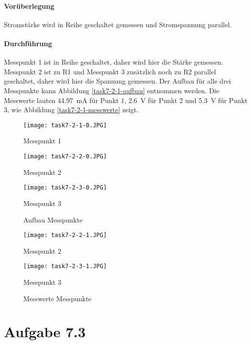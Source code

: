 \paragraph{Vorüberlegung}
Stromstärke wird in Reihe geschaltet gemessen und Stromspannung parallel.

\paragraph{Durchführung}
Messpunkt 1 ist in Reihe geschaltet, daher wird hier die Stärke gemessen. Messpunkt 2 ist zu R1 und Messpunkt 3 zusätzlich noch zu R2 parallel geschaltet, daher wird hier die Spannung gemessen. Der Aufbau für alle drei Messpunkte kann Abbildung \vref{task7-2-1-aufbau} entnommen werden. Die Messwerte lauten \SI{44.97}{\milli\ampere} für Punkt 1, \SI{2,6}{\volt} für Punkt 2 und \SI{5,3}{\volt} für Punkt 3, wie Abbildung \vref{task7-2-1-messwerte} zeigt.

\begin{figure}
	\begin{minipage}[c]{0.32\linewidth}
		\texttt{[image: task7-2-1-0.JPG]}
		\caption{Messpunkt 1}
		\label{task7-2-1-0}
	\end{minipage}
	\hfill
	\begin{minipage}[c]{0.32\linewidth}
		\texttt{[image: task7-2-2-0.JPG]}
		\caption{Messpunkt 2}
		\label{task7-2-2-0}
	\end{minipage}
	\hfill
	\begin{minipage}[c]{0.32\linewidth}
		\texttt{[image: task7-2-3-0.JPG]}
		\caption{Messpunkt 3}
		\label{task7-2-3-0}
	\end{minipage}
	\caption{Aufbau Messpunkte}
	\label{task7-2-1-aufbau}
\end{figure}

\begin{figure}
	\begin{minipage}[c]{0.48\linewidth}
		\texttt{[image: task7-2-2-1.JPG]}
		\caption{Messpunkt 2}
		\label{task7-2-2-1}
	\end{minipage}
	\hfill
	\begin{minipage}[c]{0.48\linewidth}
		\texttt{[image: task7-2-3-1.JPG]}
		\caption{Messpunkt 3}
		\label{task7-2-3-1}
	\end{minipage}
	\caption{Messwerte Messpunkte}
	\label{task7-2-1-messwerte}
\end{figure}

\section{Aufgabe 7.3}
